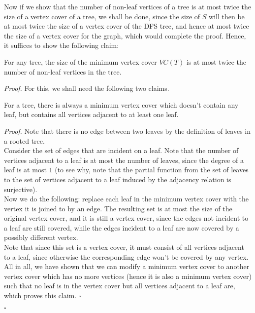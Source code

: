\documentclass[a4paper]{article}
\newenvironment{proof}{\begin{breakbox}\textit{Proof.}}{\hfill$\square$\end{breakbox}}
\newcommand{\nl}{\vspace{0.2cm}\\}
\begin{document}
Now if we show that the number of non-leaf vertices of a tree is at most twice the size of a vertex cover of a tree, we shall be done, since the size of $S$ will then be at most twice the size of a
vertex cover of the DFS tree, and hence at most twice the size of a vertex cover for the graph, which would complete the proof. Hence, it suffices to show the following claim:\nl

\begin{claim}
    For any tree, the size of the minimum vertex cover $VC(T)$ is at most twice the number of non-leaf vertices in the tree.
\end{claim}
\begin{proof}
    For this, we shall need the following two claims.\nl
    \begin{claim}
        For a tree, there is always a minimum vertex cover which doesn't contain any leaf, but contains all vertices adjacent to at least one leaf.
    \end{claim}
    \begin{proof}
        Note that there is no edge between two leaves by the definition of leaves in a rooted tree.\nl
        Consider the set of edges that are incident on a leaf.
        Note that the number of vertices adjacent to a leaf is at most the number of leaves, since the degree of a leaf is at most $1$ (to see why, note that the partial function from the set of
        leaves to the set of vertices adjacent to a leaf induced by the adjacency relation is surjective).\nl
        Now we do the following: replace each leaf in the minimum vertex cover with the vertex it is joined to by an edge. The resulting set is at most the size of the original vertex cover,
        and it is still a vertex cover, since the edges not incident to a leaf are still covered, while the edges incident to a leaf are now covered by a possibly different vertex.\nl
        Note that since this set is a vertex cover, it must consist of all vertices adjacent to a leaf, since otherwise the corresponding edge won't be covered by any vertex.\nl
        All in all, we have shown that we can modify a minimum vertex cover to another vertex cover which has no more vertices (hence it is also a minimum vertex cover) such that no leaf is in the
        vertex cover but all vertices adjacent to a leaf are, which proves this claim.
    \end{proof}
\end{proof}
\end{document}
